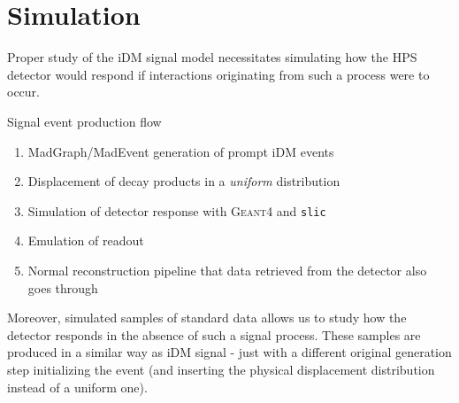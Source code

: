\chapter{Simulation}
\label{simulation_chapter}

Proper study of the iDM signal model necessitates simulating how the HPS detector
would respond if interactions originating from such a process were to occur.

Signal event production flow
\begin{enumerate}
    \item {\sc MadGraph/MadEvent} generation of prompt iDM events
    \item Displacement of decay products in a \emph{uniform} distribution
    \item Simulation of detector response with \textsc{Geant}4 and \texttt{slic}
    \item Emulation of readout
    \item Normal reconstruction pipeline that data retrieved from the detector
          also goes through
\end{enumerate}

Moreover, simulated samples of standard data allows us to study how the detector
responds in the absence of such a signal process. These samples are produced in
a similar way as iDM signal - just with a different original generation step
initializing the event (and inserting the physical displacement distribution
instead of a uniform one).

